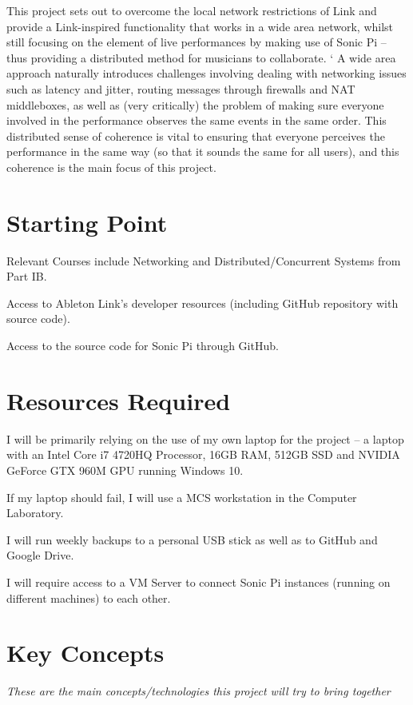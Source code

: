 \documentclass[12pt,a4paper,twoside]{article}
\begin{document}
This project sets out to overcome the local network restrictions of Link and provide a Link-inspired functionality that works in a wide area network, whilst still focusing on the element of live performances by making use of Sonic Pi -- thus providing a distributed method for musicians to collaborate.
‘
A wide area approach naturally introduces challenges involving dealing with networking issues such as latency and jitter, routing messages through firewalls and NAT middleboxes, as well as (very critically) the problem of making sure everyone involved in the performance observes the same events in the same order. This distributed sense of coherence is vital to ensuring that everyone perceives the performance in the same way (so that it sounds the same for all users), and this coherence is the main focus of this project.

\section*{Starting Point}


Relevant Courses include Networking and Distributed/Concurrent Systems from Part IB.

Access to Ableton Link's developer resources (including GitHub repository with source code).

Access to the source code for Sonic Pi through GitHub.


\section*{Resources Required}


I will be primarily relying on the use of my own laptop for the project -- a laptop with an Intel Core i7 4720HQ Processor, 16GB RAM, 512GB SSD and NVIDIA GeForce GTX 960M GPU running Windows 10.

If my laptop should fail, I will use a MCS workstation in the Computer Laboratory.

I will run weekly backups to a personal USB stick as well as to GitHub and Google Drive.

I will require access to a VM Server to connect Sonic Pi instances (running on different machines) to each other.

\section*{Key Concepts}

\emph{These are the main concepts/technologies this project will try to bring together}
\end{document}
